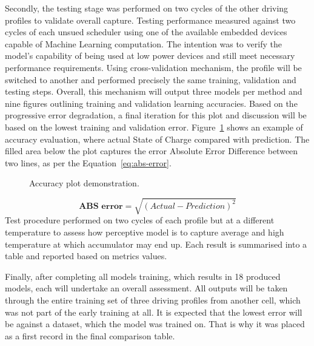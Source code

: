 %
%
Secondly, the testing stage was performed on two cycles of the other driving profiles to validate overall capture.
Testing performance measured against two cycles of each unsued scheduler using one of the available embedded devices capable of Machine Learning computation.
The intention was to verify the model's capability of being used at low power devices and still meet necessary performance requirements.
%
Using cross-validation mechanism, the profile will be switched to another and performed precisely the same training, validation and testing steps.
Overall, this mechanism will output three models per method and nine figures outlining training and validation learning accuracies.
%
Based on the progressive error degradation, a final iteration for this plot and discussion will be based on the lowest training and validation error.
%
Figure~\ref{fig:plot_demo} shows an example of accuracy evaluation, where actual State of Charge compared with prediction.
The filled area below the plot captures the error Absolute Error Difference between two lines, as per the Equation~\ref{eq:abs-error}.
\begin{figure}[ht]
    \centering
    
    \caption{Accuracy plot demonstration.}
    \label{fig:plot_demo}
\end{figure}
\begin{equation}
    \textbf{ABS error}  = \sqrt{(Actual-Prediction)^2}
    \label{eq:abs-error}
\end{equation}
Test procedure performed on two cycles of each profile but at a different temperature to assess how perceptive model is to capture average and high temperature at which accumulator may end up.
Each result is summarised into a table and reported based on metrics values.

%
%
Finally, after completing all models training, which results in 18 produced models, each will undertake an overall assessment.
All outputs will be taken through the entire training set of three driving profiles from another cell, which was not part of the early training at all.
It is expected that the lowest error will be against a dataset, which the model was trained on.
That is why it was placed as a first record in the final comparison table.
%

